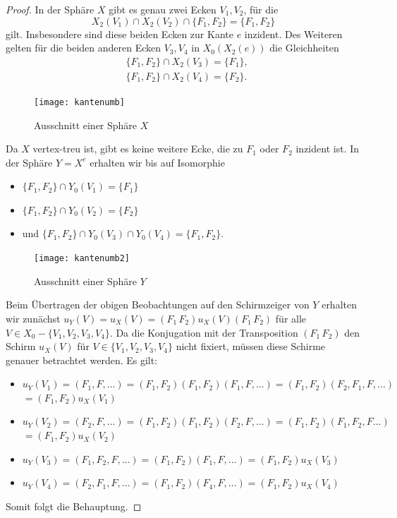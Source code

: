 \documentclass[12pt,titlepage,twoside,cleardoublepage]{article}
\theoremstyle{nummermitklammern}
\numberwithin{equation}{section}
\begin{document}
\begin{proof}
In der Sphäre $X$ gibt es genau zwei Ecken $V_1,V_2$, für die 
\[
X_2(V_1)\cap X_2(V_2)\cap \{F_1,F_2\}=\{F_1,F_2\}
\] 
gilt. Insbesondere sind diese beiden Ecken zur Kante $e$  inzident. Des Weiteren gelten für die beiden anderen Ecken $V_3,V_4$ in $X_0(X_2(e))$ die Gleichheiten 
\begin{align*}
&\{F_1,F_2\} \cap X_2(V_3)=\{F_1\},\\
&\{F_1,F_2\} \cap X_2(V_4)=\{F_2\}.
\end{align*}  
\begin{figure}[H]
\begin{center}
\texttt{[image: kantenumb]}
\end{center}
\caption{Ausschnitt einer Sphäre $X$}
\end{figure}
Da $X$ vertex-treu ist, gibt es keine weitere Ecke, die zu $F_1$ oder $F_2$ inzident ist.
In der Sphäre $Y=X^e$ erhalten wir bis auf Isomorphie  
\begin{itemize}
\item $\{F_1,F_2\} \cap Y_0(V_1)=\{F_1\}$ 
\item $\{F_1,F_2\} \cap Y_0(V_2)=\{F_2\}$
\item und $\{F_1,F_2\} \cap Y_0(V_3)\cap Y_0(V_4)=\{F_1,F_2\}$.
\end{itemize}
\begin{figure}[H]
\begin{center}
\texttt{[image: kantenumb2]}
\end{center}
\caption{Ausschnitt einer Sphäre $Y$}
\end{figure}
Beim Übertragen der obigen Beobachtungen auf den Schirmzeiger von $Y$ erhalten wir zunächst $u_Y(V)=u_X(V)=(F_1\,F_2)u_X(V) (F_1\,F_2)$
für alle $V\in X_0-\{V_1,V_2,V_3,V_4\}.$
Da die Konjugation mit der Transposition $(F_1\,F_2)$ den Schirm $u_X(V)$ für $V\in \{V_1,V_2,V_3,V_4\}$ nicht fixiert, müssen diese Schirme genauer betrachtet werden. 
Es gilt:
\begin{itemize} 
\item $u_{Y}(V_1)=(F_1,F,\ldots)=(F_1,F_2)(F_1,F_2)(F_1,F,\ldots)=(F_1,F_2)(F_2,F_1,F,\ldots)$ \\$=(F_1,F_2)u_X(V_1)$
\item $u_{Y}(V_2)=(F_2,F,\ldots)=(F_1,F_2)(F_1,F_2)(F_2,F,\ldots)=(F_1,F_2)(F_1,F_2,F\ldots)$\\$=(F_1,F_2)u_X(V_2)$
\item $u_{Y}(V_3)=(F_1,F_2,F,\ldots)=(F_1,F_2)(F_1,F,\ldots)=(F_1,F_2)u_X(V_3)$
\item $u_{Y}(V_4)=(F_2,F_1,F,\ldots)=(F_1,F_2)(F_4,F,\ldots)=(F_1,F_2)u_X(V_4)$
\end{itemize}
Somit folgt die Behauptung.
\end{proof}
\end{document}

